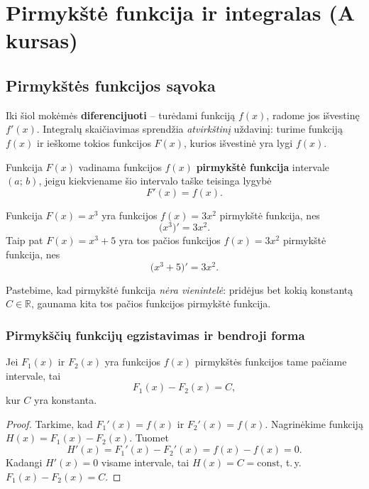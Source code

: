 \chapter{Pirmykštė funkcija ir integralas (A kursas)}

\section{Pirmykštės funkcijos sąvoka}

Iki šiol mokėmės \textbf{diferencijuoti} -- turėdami funkciją $f(x)$, radome jos išvestinę $f'(x)$.
Integralų skaičiavimas sprendžia \emph{atvirkštinį} uždavinį: turime funkciją $f(x)$ ir
ieškome tokios funkcijos $F(x)$, kurios išvestinė yra lygi $f(x)$.

\begin{definition}
Funkcija $F(x)$ vadinama funkcijos $f(x)$ \textbf{pirmykštė funkcija} intervale $(a;\,b)$,
jeigu kiekviename šio intervalo taške teisinga lygybė
\[
    F'(x) = f(x).
\]
\end{definition}

\begin{example}
Funkcija $F(x) = x^3$ yra funkcijos $f(x) = 3x^2$ pirmykštė funkcija, nes
\[
    \bigl(x^3\bigr)' = 3x^2.
\]
Taip pat $F(x) = x^3 + 5$ yra tos pačios funkcijos $f(x)=3x^2$ pirmykštė funkcija, nes
\[
    \bigl(x^3 + 5\bigr)' = 3x^2.
\]
\end{example}

Pastebime, kad pirmykštė funkcija \emph{nėra vienintelė}: pridėjus bet kokią konstantą $C \in \mathbb{R}$,
gaunama kita tos pačios funkcijos pirmykštė funkcija.

\subsection*{Pirmykščių funkcijų egzistavimas ir bendroji forma}

\begin{theorem}
Jei $F_1(x)$ ir $F_2(x)$ yra funkcijos $f(x)$ pirmykštės funkcijos tame pačiame intervale, tai
\[
    F_1(x) - F_2(x) = C,
\]
kur $C$ yra konstanta.
\end{theorem}

\begin{proof}
Tarkime, kad $F_1'(x) = f(x)$ ir $F_2'(x) = f(x)$. Nagrinėkime funkciją $H(x) = F_1(x) - F_2(x)$.
Tuomet
\[
    H'(x) = F_1'(x) - F_2'(x) = f(x) - f(x) = 0.
\]
Kadangi $H'(x)=0$ visame intervale, tai $H(x) = C = \mathrm{const}$, t.\,y.\
$F_1(x) - F_2(x) = C$.
\end{proof}

